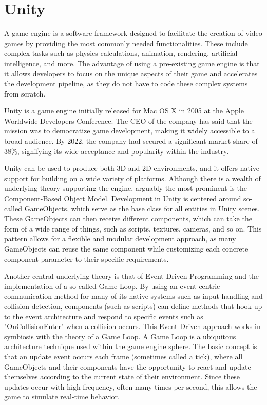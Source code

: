 \section{Unity}

A game engine is a software framework designed to facilitate the creation of video games by providing the most commonly needed functionalities. These include complex tasks such as physics calculations, animation, rendering, artificial intelligence, and more. The advantage of using a pre-existing game engine is that it allows developers to focus on the unique aspects of their game and accelerates the development pipeline, as they do not have to code these complex systems from scratch.

Unity is a game engine initially released for Mac OS X in 2005 at the Apple Worldwide Developers Conference\cite{macworld2005}. The CEO of the company has said that the mission was to democratize game development, making it widely accessible to a broad audience\cite{polygon2014}. By 2022, the company had secured a significant market share of 38\%, signifying its wide acceptance and popularity within the industry\cite{slashdata2022}.

Unity can be used to produce both 3D and 2D environments, and it offers native support for building on a wide variety of platforms. Although there is a wealth of underlying theory supporting the engine, arguably the most prominent is the Component-Based Object Model. Development in Unity is centered around so-called GameObjects, which serve as the base class for all entities in Unity scenes. These GameObjects can then receive different components, which can take the form of a wide range of things, such as scripts, textures, cameras, and so on. This pattern allows for a flexible and modular development approach, as many GameObjects can reuse the same component while customizing each concrete component parameter to their specific requirements.

Another central underlying theory is that of Event-Driven Programming and the implementation of a so-called Game Loop\cite{gameprogrammingpatterns2023}. By using an event-centric communication method for many of its native systems such as input handling and collision detection, components (such as scripts) can define methods that hook up to the event architecture and respond to specific events such as "OnCollisionEnter" when a collision occurs\cite{unityManualExecutionOrder2023}\cite{unityManualEventFunctions2023}. This Event-Driven approach works in symbiosis with the theory of a Game Loop. A Game Loop is a ubiquitous architecture technique used within the game engine sphere. The basic concept is that an update event occurs each frame (sometimes called a tick), where all GameObjects and their components have the opportunity to react and update themselves according to the current state of their environment. Since these updates occur with high frequency, often many times per second, this allows the game to simulate real-time behavior.

